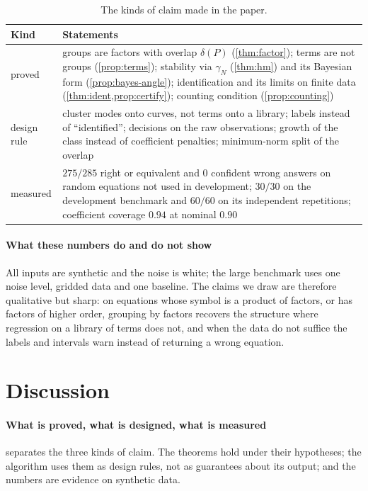\documentclass[11pt]{article}
\theoremstyle{plain}
\theoremstyle{definition}
\theoremstyle{remark}
\newcommand{\gN}{\gamma_{N}}                %
\newcommand{\deltaP}{\delta(P)}             %
\begin{document}
\begin{table}[b]
\centering\small
\caption{The kinds of claim made in the paper.}\label{tab:status}
\begin{tabularx}{\linewidth}{@{}>{\raggedright\arraybackslash}p{2.0cm}X@{}}
\toprule
Kind & Statements\\
\midrule
proved & groups are factors with overlap $\deltaP$ (\cref{thm:factor}); terms are not groups (\cref{prop:terms});
stability via $\gN$ (\cref{thm:hm}) and its Bayesian form (\cref{prop:bayes-angle}); identification and its limits on
finite data (\cref{thm:ident,prop:certify}); counting condition (\cref{prop:counting})\\
design rule & cluster modes onto curves, not terms onto a library; labels instead of ``identified''; decisions on the raw
observations; growth of the class instead of coefficient penalties; minimum-norm split of the overlap\\
measured & $275/285$ right or equivalent and $0$ confident wrong answers on random equations not used in development;
$30/30$ on the development benchmark and $60/60$ on its independent repetitions; coefficient coverage $0.94$ at nominal
$0.90$\\
\bottomrule
\end{tabularx}
\end{table}

\paragraph{What these numbers do and do not show} All inputs are synthetic and the noise is white; the large benchmark
uses one noise level, gridded data and one baseline. The claims we draw are therefore qualitative but sharp: on
equations whose symbol is a product of factors, or has factors of higher order, grouping by factors recovers the
structure where regression on a library of terms does not, and when the data do not suffice the labels and intervals
warn instead of returning a wrong equation.

\section{Discussion}\label{sec:discussion}
\paragraph{What is proved, what is designed, what is measured}  separates the three kinds of claim. The
theorems hold under their hypotheses; the algorithm uses them as design rules, not as guarantees about its output; and
the numbers are evidence on synthetic data.
\end{document}
